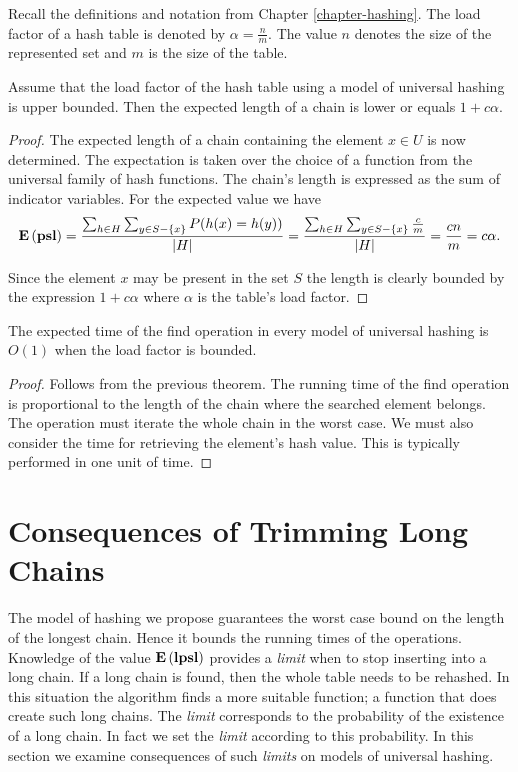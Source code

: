 Recall the definitions and notation from Chapter \ref{chapter-hashing}. The load factor of a hash table is denoted by $\alpha = \frac{n}{m}$. The value $n$ denotes the size of the represented set and $m$ is the size of the table.

\begin{theorem}
\label{theorem-expected-chain-length-universal}
Assume that the load factor of the hash table using a model of universal hashing is upper bounded. Then the expected length of a chain is lower or equals $1 + c \alpha$.
\end{theorem}
\begin{proof}
The expected length of a chain containing the element $x \in U$ is now determined. The expectation is taken over the choice of a function from the universal family of hash functions. The chain's length is expressed as the sum of indicator variables. For the expected value we have
\begin{displaymath}
\mathbf{E}\left(\mathbf{psl}\right) = \frac{\sum\displaylimits_{h \in H} \sum\displaylimits_{y \in S - \lbrace x \rbrace} P(h(x) = h(y))}{|H|} = \frac{\sum\displaylimits_{h \in H} \sum\displaylimits_{y \in S - \lbrace x \rbrace} \frac{c}{m}}{|H|} = \frac{cn}{m} = c \alpha \text{.}
\end{displaymath}

Since the element $x$ may be present in the set $S$ the length is clearly bounded by the expression $1 + c\alpha$ where $\alpha$ is the table's load factor.
\end{proof}

\begin{corollary}
\label{corollary-find-time}
The expected time of the find operation in every model of universal hashing is $O(1)$ when the load factor is bounded.
\end{corollary}
\begin{proof}
Follows from the previous theorem. The running time of the find operation is proportional to the length of the chain where the searched element belongs. The operation must iterate the whole chain in the worst case. We must also consider the time for retrieving the element's hash value. This is typically performed in one unit of time. 
\end{proof}

\section{Consequences of Trimming Long Chains}
The model of hashing we propose guarantees the worst case bound on the length of the longest chain. Hence it bounds the running times of the operations. Knowledge of the value $\mathbf{E}\left(\mathbf{lpsl}\right)$ provides a \emph{limit} when to stop inserting into a long chain. If a long chain is found, then the whole table needs to be rehashed. In this situation the algorithm finds a more suitable function; a function that does create such long chains. The \emph{limit} corresponds to the probability of the existence of a long chain. In fact we set the \emph{limit} according to this probability. In this section we examine consequences of such \emph{limits} on models of universal hashing.

